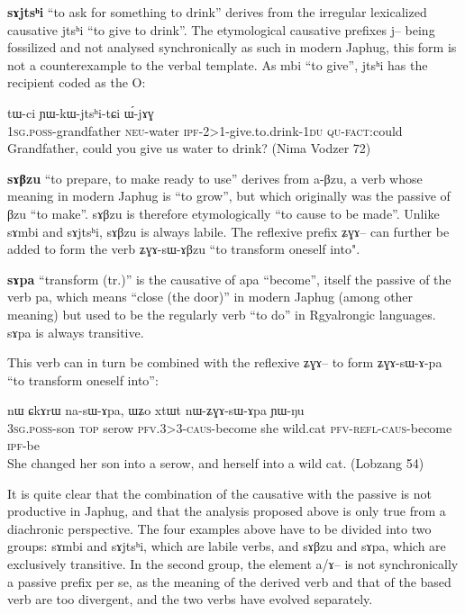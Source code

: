 \documentclass[oldfontcommands,oneside,a4paper,11pt]{article}
\newcommand{\ipa}[1]{{\phon \mbox{#1}}} %
\newcommand{\sg}{\textsc{sg}}
\newcommand{\pfv}{\textsc{pfv}}
\newcommand{\caus}{\textsc{caus}}
\newcommand{\du}{\textsc{du}}
\newcommand{\ipf}{\textsc{ipf}}
\newcommand{\neu}{\textsc{neu}}
\newcommand{\fact}{\textsc{fact}}
\newcommand{\poss}{\textsc{poss}}
\newcommand{\qu}{\textsc{qu}}
\newcommand{\refl}{\textsc{refl}}
\newcommand{\topic}{\textsc{top}}
\begin{document}
  
  
    \textbf{\ipa{sɤjtsʰi}} ``to ask for something to drink'' derives from the irregular lexicalized causative \ipa{jtsʰi} ``to give to drink''. The etymological causative prefixes \ipa{j}-- being fossilized and not analysed synchronically as such in modern Japhug, this form is not a counterexample to the verbal template. As \ipa{mbi} ``to give'', \ipa{jtsʰi} has the recipient coded as the O:
      \begin{exe}
\ex
\gll   \ipa{a-wɯ} 	\ipa{tɯ-ci} 	\ipa{ɲɯ-kɯ-jtsʰi-tɕi} 	\ipa{ɯ́-jɤɣ}  \\
1\sg{}.\poss{}-grandfather \neu{}-water \ipf{}-2>1-give.to.drink-1\du{} \qu{}-\fact{}:could \\
 \glt Grandfather, could you give us water to drink? (Nima Vodzer 72)
\end{exe}   
 
  
  \textbf{\ipa{sɤβzu}} ``to prepare, to make ready to use'' derives from \ipa{a-βzu}, a verb whose meaning in modern Japhug is ``to grow'', but which originally was the passive of \ipa{βzu} ``to make''. \ipa{sɤβzu}  is therefore etymologically ``to cause to be made''. Unlike   \ipa{sɤmbi} and \ipa{sɤjtsʰi}, \ipa{sɤβzu} is always labile. The reflexive prefix \ipa{ʑɣɤ}-- can further be added to form the verb \ipa{ʑɣɤ-sɯ-ɤβzu} ``to transform oneself into".

  \textbf{\ipa{sɤpa}} ``transform (tr.)'' is the causative of \ipa{apa} ``become'', itself the passive of the verb \ipa{pa}, which means ``close (the door)'' in modern Japhug (among other meaning) but used to be the  regularly verb ``to do'' in Rgyalrongic languages. \ipa{sɤpa} is always transitive.
  
  This verb can in turn be combined with the reflexive \ipa{ʑɣɤ}-- to form \ipa{ʑɣɤ-sɯ-ɤ-pa} ``to transform oneself into'':
  
  \begin{exe}
\ex
\gll \ipa{ɯ-tɕɯ} 	\ipa{nɯ} 	\ipa{ɕkɤrɯ} 	\ipa{na-sɯ-ɤpa,} 	\ipa{ɯʑo} 	\ipa{xtɯt} 	\ipa{nɯ-ʑɣɤ-sɯ-ɤpa} 	\ipa{ɲɯ-ŋu} \\
3\sg{}.\poss{}-son \topic{} serow \pfv{}.3>3-\caus{}-become she wild.cat \pfv{}-\refl{}-\caus{}-become \ipf{}-be\\
 \glt She changed her son into a serow, and herself into a wild cat.  (Lobzang 54)
\end{exe} 


It is quite clear that the combination of the causative with the passive is not productive in Japhug, and that the analysis proposed above is only true from a diachronic perspective. The four examples above have to be divided into two groups:   \ipa{sɤmbi} and \ipa{sɤjtsʰi}, which are labile verbs, and \ipa{sɤβzu} and \ipa{sɤpa}, which are exclusively transitive. In the second group,  the element \ipa{a/ɤ}-- is not synchronically a passive prefix per se, as the meaning of the derived verb and that of the based verb are too divergent, and the two verbs have evolved separately.
\end{document}
